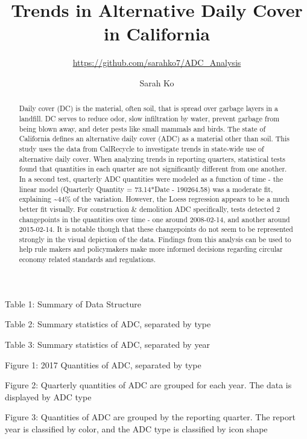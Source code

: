 \documentclass[12pt,]{article}
\title{Trends in Alternative Daily Cover in California}
\subtitle{\url{https://github.com/sarahko7/ADC_Analysis}}
\author{Sarah Ko}
\date{}
\begin{document}
\maketitle
\begin{abstract}
Daily cover (DC) is the material, often soil, that is spread over
garbage layers in a landfill. DC serves to reduce odor, slow
infiltration by water, prevent garbage from being blown away, and deter
pests like small mammals and birds. The state of California defines an
alternative daily cover (ADC) as a material other than soil. This study
uses the data from CalRecycle to investigate trends in state-wide use of
alternative daily cover. When analyzing trends in reporting quarters,
statistical tests found that quantities in each quarter are not
significantly different from one another. In a second test, quarterly
ADC quantities were modeled as a function of time - the linear model
(Quarterly Quantity = 73.14*Date - 190264.58) was a moderate fit,
explaining \textasciitilde{}44\% of the variation. However, the Loess
regression appears to be a much better fit visually. For construction \&
demolition ADC specifically, tests detected 2 changepoints in the
quantities over time - one around 2008-02-14, and another around
2015-02-14. It is notable though that these changepoints do not seem to
be represented strongly in the visual depiction of the data. Findings
from this analysis can be used to help rule makers and policymakers make
more informed decisions regarding circular economy related standards and
regulations.
\end{abstract}

\newpage

\tableofcontents 

\newpage

\newpage

\listoftables 

Table 1: Summary of Data Structure

Table 2: Summary statistics of ADC, separated by type

Table 3: Summary statistics of ADC, separated by year

\newpage

\listoffigures 

Figure 1: 2017 Quantities of ADC, separated by type

Figure 2: Quarterly quantities of ADC are grouped for each year. The
data is displayed by ADC type

Figure 3: Quantities of ADC are grouped by the reporting quarter. The
report year is classified by color, and the ADC type is classified by
icon shape
\end{document}
